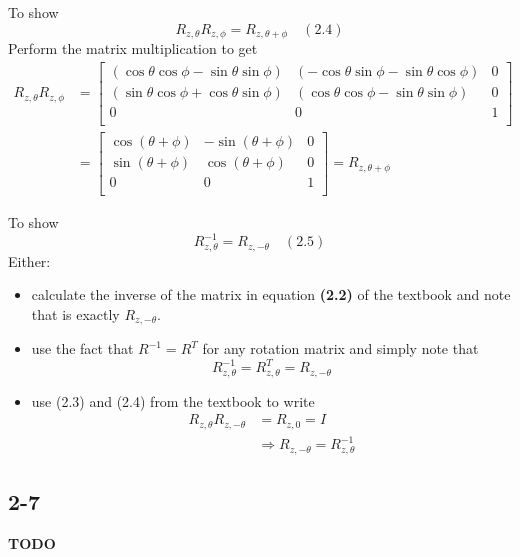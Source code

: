To show
\begin{equation*}
R_{z,\theta} R_{z,\phi}= R_{z,\theta+\phi} \quad (2.4)
\end{equation*}
Perform the matrix multiplication to get
\begin{align*} 
R_{z,\theta} R_{z,\phi} &= \left[\begin{array}{ccc} 
(\cos\theta \cos \phi - \sin\theta \sin \phi) & (-\cos\theta \sin\phi - \sin\theta \cos\phi) & 0 \\  
(\sin\theta \cos\phi +\cos\theta \sin\phi) & (\cos\theta \cos \phi - \sin\theta \sin \phi) & 0 \\ 
0 & 0 & 1 \\   
\end{array}\right] \\
&=\left[\begin{array}{ccc} 
\cos(\theta + \phi)& -\sin(\theta + \phi) & 0 \\  
\sin(\theta + \phi) & \cos(\theta + \phi) & 0 \\ 
0 & 0 & 1 \\   
\end{array}\right] = R_{z,\theta+\phi}
\end{align*}

To show
\begin{equation*}
R_{z,\theta}^{-1} = R_{z,-\theta} \quad (2.5)
\end{equation*}
Either:
\begin{itemize}
	\item calculate the inverse of the matrix in equation \textbf{(2.2)} of the textbook and note that is exactly $R_{z,-\theta}$.
	\item use the fact that $R^{-1}=R^T$ for any rotation matrix and simply note that
	\begin{equation*}
	R_{z,\theta}^{-1} = R_{z,\theta}^{T} = R_{z,-\theta}
	\end{equation*}
	\item use (2.3) and (2.4) from the textbook to write
	\begin{align*}
	R_{z,\theta} R_{z,-\theta} &= R_{z,0} = I \\
	&\Rightarrow R_{z,-\theta} = R_{z,\theta}^{-1}
	\end{align*}
\end{itemize}

\subsection*{2-7}
\textbf{TODO}
